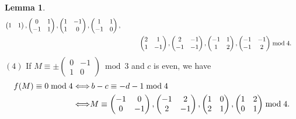 \documentclass[12pt]{article}
\theoremstyle{definition}
\newtheorem{lemma}[theorem]{Lemma}
\numberwithin{equation}{section}
\numberwithin{theorem}{section}
\begin{document}
\begin{lemma}
{\begin{align}
\begin{pmatrix}
1 & 1
\end{pmatrix}, 
\begin{pmatrix}
0 & 1 \\
-1 & 1
\end{pmatrix}, 
\begin{pmatrix}
1 & -1 \\
1 & 0
\end{pmatrix}, 
\begin{pmatrix}
1 & 1 \\
-1 & 0
\end{pmatrix},  \notag \\
&\hspace{10mm}
\begin{pmatrix}
2 & 1 \\
1 & -1
\end{pmatrix}, 
\begin{pmatrix}
2 & -1 \\
-1 & -1
\end{pmatrix}, 
\begin{pmatrix}
-1 & 1 \\
1 & 2
\end{pmatrix}, 
\begin{pmatrix}
-1 & -1 \\
-1 & 2
\end{pmatrix} \bmod{4}.   \label{eqn:level3-mod4-pmT-c-odd}
\end{align}
$\mathrm{(4)}$ If 
$
M
\equiv
\pm
\begin{pmatrix}
0 & -1 \\
1 & 0
\end{pmatrix}
\bmod{3}
$ 
and $c$ is even, we have  
\begin{align}
\label{eqn:level3-mod4-pmT-c-even}
f(M)\equiv 0 \bmod{4} 
\Longleftrightarrow& \,
b-c\equiv -d-1 \bmod{4} \notag \\
\Longleftrightarrow&
M
\equiv 
\begin{pmatrix}
-1 & 0 \\
0 & -1
\end{pmatrix}, 
\begin{pmatrix}
-1 & 2 \\
2 & -1
\end{pmatrix}, 
\begin{pmatrix}
1 & 0 \\
2 & 1
\end{pmatrix}, 
\begin{pmatrix}
1 & 2 \\
0 & 1
\end{pmatrix} 
\bmod{4}.
\end{align}
}
\end{lemma}
\end{document}
